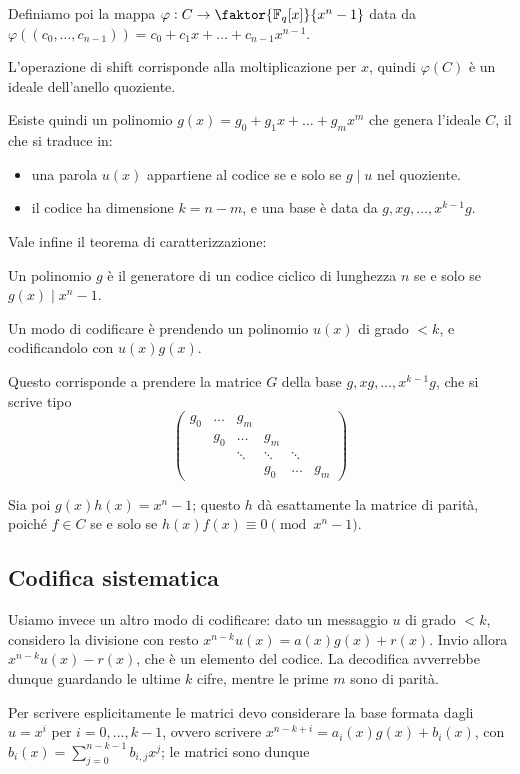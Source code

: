 \documentclass[a4paper]{book}
\begin{document}
    Definiamo poi la mappa $\varphi: C\to \faktor{\F_q[x]}{x^n-1}$ data da $\varphi((c_0,\dots,c_{n-1}))=c_0+c_1x+\dots+c_{n-1}x^{n-1}$.

    L'operazione di shift corrisponde alla moltiplicazione per $x$, quindi $\varphi(C)$ è un ideale dell'anello quoziente.

    Esiste quindi un polinomio $g(x)=g_0+g_1x+\dots+g_mx^m$ che genera l'ideale $C$, il che si traduce in:
    \begin{itemize}
        \item una parola $u(x)$ appartiene al codice se e solo se $g\mid u$ nel quoziente.
        \item il codice ha dimensione $k=n-m$, e una base è data da $g,xg,\dots, x^{k-1}g$.
    \end{itemize}

    Vale infine il teorema di caratterizzazione:
    \begin{theorem}
        Un polinomio $g$ è il generatore di un codice ciclico di lunghezza $n$ se e solo se $g(x)\mid x^n-1$.
    \end{theorem}


    Un modo di codificare è prendendo un polinomio $u(x)$ di grado $<k$, e codificandolo con $u(x)g(x)$.

    Questo corrisponde a prendere la matrice $G$ della base $g,xg,\dots,x^{k-1}g$, che si scrive tipo $$\begin{pmatrix}
    g_0 & \dots & g_m\\
    & g_0 & \dots & g_m\\
    & & \ddots & \ddots & \ddots \\
    & & & g_0 & \dots & g_m
    \end{pmatrix}$$

    Sia poi $g(x)h(x)=x^n-1$; questo $h$ dà esattamente la matrice di parità, poiché $f\in C$ se e solo se $h(x)f(x)\equiv0\pmod{x^n-1}$.

    \subsection{Codifica sistematica}
    Usiamo invece un altro modo di codificare: dato un messaggio $u$ di grado $<k$, considero la divisione con resto $x^{n-k}u(x)=a(x)g(x)+r(x)$. Invio allora $x^{n-k}u(x)-r(x)$, che è un elemento del codice. La decodifica avverrebbe dunque guardando le ultime $k$ cifre, mentre le prime $m$ sono di parità.

    Per scrivere esplicitamente le matrici devo considerare la base formata dagli $u=x^i$ per $i=0,\dots,k-1$, ovvero scrivere $x^{n-k+i}=a_i(x)g(x)+b_i(x)$, con $b_i(x)=\sum_{j=0}^{n-k-1}b_{i,j}x^j$; le matrici sono dunque
\end{document}
